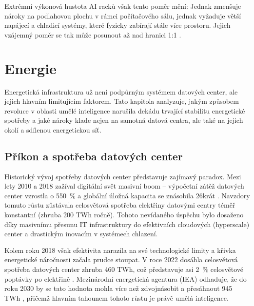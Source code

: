 Extrémní výkonová hustota AI racků však tento poměr mění: Jednak zmenšuje nároky na podlahovou plochu v rámci počítačového sálu, jednak vyžaduje větší napájecí a chladicí systémy, které fyzicky zabírají stále více prostoru. Jejich vzájemný poměr se tak může posunout až nad hranici 1:1 \cite{butler_unlocking_2025}.

\section{Energie}
\label{sec:energie}

Energetická infrastruktura už není podpůrným systémem datových center, ale jejich hlavním limitujícím faktorem. Tato kapitola analyzuje, jakým způsobem revoluce v oblasti umělé inteligence narušila dekádu trvající stabilitu energetické spotřeby a jaké nároky klade nejen na samotná datová centra, ale také na jejich okolí a sdílenou energetickou síť.


\subsection{Příkon a spotřeba datových center}

Historický vývoj spotřeby datových center představuje zajímavý paradox. Mezi lety 2010 a 2018 zažíval digitální svět masivní boom -- výpočetní zátěž datových center vzrostla o 550~\% a globální úložná kapacita se znásobila 26krát \cite[s. 10]{de_roucy-rochegonde_ai_2025}. Navzdory tomuto růstu zůstávala celosvětová spotřeba elektřiny datovými centry téměř konstantní (zhruba 200 TWh ročně). Tohoto nevídaného úspěchu bylo dosaženo díky masivnímu přesunu IT infrastruktury do efektivních cloudových (hyperscale) center a drastickým inovacím v systémech chlazení. \cite[s. 255]{barroso_data_2026}

Kolem roku 2018 však efektivita narazila na své technologické limity a křivka energetické náročnosti začala prudce stoupat. V roce 2022 dosáhla celosvětová spotřeba datových center zhruba 460 TWh, což představuje asi 2~\% celosvětové poptávky po elektřině \cite{de_roucy-rochegonde_ai_2025, sheng_power_2026}. Mezinárodní energetická agentura (IEA) odhaduje, že do roku 2030 by se tato hodnota mohla více než zdvojnásobit a přesáhnout 945 TWh \cite[s. 14]{iea_energy_2025}, přičemž hlavním tahounem tohoto růstu je právě umělá inteligence. 

